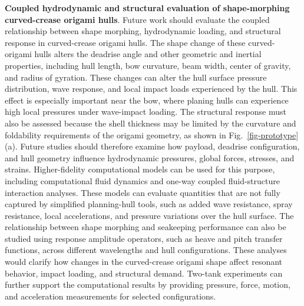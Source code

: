 \noindent{}\textbf{Coupled hydrodynamic and structural evaluation of shape-morphing curved-crease origami hulls}. Future work should evaluate the coupled relationship between shape morphing, hydrodynamic loading, and structural response in curved-crease origami hulls. The shape change of these curved-origami hulls alters the deadrise angle and other geometric and inertial properties, including hull length, bow curvature, beam width, center of gravity, and radius of gyration. These changes can alter the hull surface pressure distribution, wave response, and local impact loads experienced by the hull. This effect is especially important near the bow, where planing hulls can experience high local pressures under wave-impact loading. The structural response must also be assessed because the shell thickness may be limited by the curvature and foldability requirements of the origami geometry, as shown in Fig.~\ref{fig-prototype}\,(a). Future studies should therefore examine how payload, deadrise configuration, and hull geometry influence hydrodynamic pressures, global forces, stresses, and strains. Higher-fidelity computational models can be used for this purpose, including computational fluid dynamics and one-way coupled fluid-structure interaction analyses. These models can evaluate quantities that are not fully captured by simplified planning-hull tools, such as added wave resistance, spray resistance, local accelerations, and pressure variations over the hull surface. The relationship between shape morphing and seakeeping performance can also be studied using response amplitude operators, such as heave and pitch transfer functions, across different wavelengths and hull configurations. These analyses would clarify how changes in the curved-crease origami shape affect resonant behavior, impact loading, and structural demand. Two-tank experiments can further support the computational results by providing pressure, force, motion, and acceleration measurements for selected configurations.
